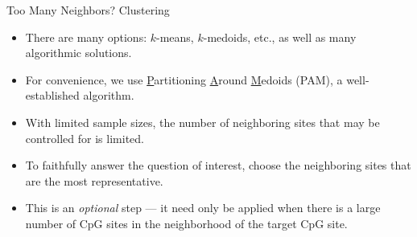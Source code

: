 \documentclass[12pt,t]{beamer}
\begin{document}
\begin{frame}[c]{Too Many Neighbors? Clustering}

\begin{center}
\begin{itemize}
  \itemsep10pt
  \item There are many options: $k$-means, $k$-medoids, etc., as well as many
    algorithmic solutions.
  \item For convenience, we use \underline{P}artitioning \underline{A}round
    \underline{M}edoids (PAM), a well-established algorithm.
  \item With limited sample sizes, the number of neighboring sites that may be
    controlled for is limited.
  \item To faithfully answer the question of interest, choose the neighboring
    sites that are the most representative.
  \item This is an \textit{optional} step --- it need only be applied when there
    is a large number of CpG sites in the neighborhood of the target CpG site.
\end{itemize}
\end{center}


\end{frame}

\end{document}
